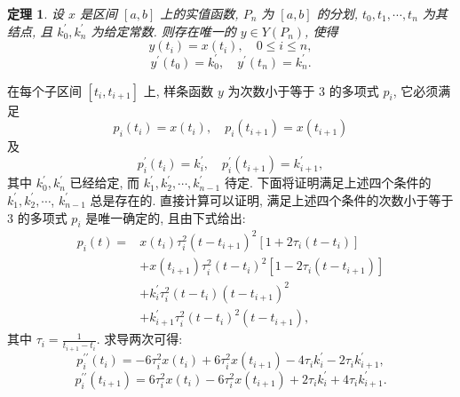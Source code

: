 \documentclass[openany]{ctexbook}
\makeatletter
\theoremstyle{kaiti}
\newtheorem{theorem}{定理}[section]
\theoremstyle{normal}
\renewenvironment{proof}[1][\proofname]{\par
    \pushQED{\qed}%
    \normalfont \topsep6\p@\@plus6\p@\relax
    \trivlist
    \item\relax
    {\heiti #1}\hspace{2\labelsep}\ignorespaces
  }{%
    \popQED\endtrivlist\@endpefalse
  }
\makeatother
\begin{document}
\begin{theorem}
设 $x$ 是区间 $[a, b]$ 上的实值函数, $P_n$ 为 $[a, b]$ 的分划, $t_0, t_1, \cdots, t_n$ 为其结点, 且 $k_0^{\prime}, k_n^{\prime}$ 为给定常数. 则存在唯一的 $y \in Y\left(P_n\right)$, 使得
\begin{equation}
  y\left(t_{i}\right)=x\left(t_{i}\right), \quad 0 \leqslant i \leqslant n,
\end{equation}
\begin{equation}
  y^{\prime}\left(t_0\right)=k_0^{\prime}, \quad y^{\prime}\left(t_n\right)=k_n^{\prime}.
\end{equation}
\end{theorem}

\begin{proof}
在每个子区间 $\left[t_{i}, t_{i+1}\right]$ 上, 样条函数 $y$ 为次数小于等于 3 的多项式 $p_{i}$, 它必须满足
$$
p_{i}\left(t_{i}\right)=x\left(t_{i}\right), \quad p_{i}\left(t_{i+1}\right)=x\left(t_{i+1}\right)
$$
及
$$
p_{i}^{\prime}\left(t_{i}\right)=k_{i}^{\prime}, \quad p_{i}^{\prime}\left(t_{i+1}\right)=k_{i+1}^{\prime},
$$
其中 $k_0^{\prime}, k_n^{\prime}$ 已经给定, 而 $k_1^{\prime}, k_2^{\prime}, \cdots, k_{n-1}^{\prime}$ 待定. 下面将证明满足上述四个条件的 $k_1^{\prime}, k_2^{\prime}, \cdots$, $k_{n-1}^{\prime}$ 总是存在的. 直接计算可以证明, 满足上述四个条件的次数小于等于 3 的多项式 $p_{i}$ 是唯一确定的, 且由下式给出:
$$
\begin{aligned}
p_{i}(t)=& x\left(t_{i}\right) \tau_{i}^2\left(t-t_{i+1}\right)^2\left[1+2 \tau_{i}\left(t-t_{i}\right)\right] \\
&+x\left(t_{i+1}\right) \tau_{i}^2\left(t-t_{i}\right)^2\left[1-2 \tau_{i}\left(t-t_{i+1}\right)\right] \\
&+k_{i}^{\prime} \tau_{i}^2\left(t-t_{i}\right)\left(t-t_{i+1}\right)^2 \\
&+k_{i+1}^{\prime} \tau_{i}^2\left(t-t_{i}\right)^2\left(t-t_{i+1}\right),
\end{aligned}
$$
其中 $\tau_{i}=\frac{1}{t_{i+1}-t_{i}}$. 求导两次可得:
\begin{equation}
  p_{i}^{\prime \prime}\left(t_{i}\right)=-6 \tau_{i}^2 x\left(t_{i}\right)+6 \tau_{i}^2 x\left(t_{i+1}\right)-4 \tau_{i} k_{i}^{\prime}-2 \tau_{i} k_{i+1}^{\prime},
\end{equation}
\begin{equation}
  p_{i}^{\prime \prime}\left(t_{i+1}\right)=6 \tau_{i}^2 x\left(t_{i}\right)-6 \tau_{i}^2 x\left(t_{i+1}\right)+2 \tau_{i} k_{i}^{\prime}+4 \tau_{i} k_{i+1}^{\prime}.
\end{equation}

\end{proof}
\end{document}
